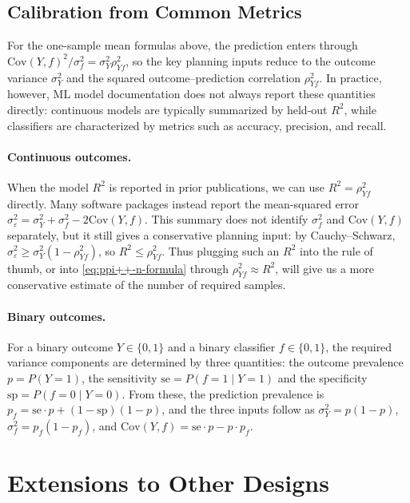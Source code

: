 \documentclass[12pt]{article}
\newcommand{\Cov}{\mathrm{Cov}}
\begin{document}
\subsection{Calibration from Common Metrics}
\label{sec:calibration}

For the one-sample mean formulas above, the prediction enters through
$\Cov(Y,f)^2/\sigma_f^2 = \sigma_Y^2\rho_{Yf}^2$, so the key planning inputs
reduce to the outcome variance $\sigma_Y^2$ and the squared
outcome--prediction correlation $\rho_{Yf}^2$. In practice, however, ML model
documentation does not always report these quantities directly: continuous
models are typically summarized by held-out $R^2$, while classifiers are
characterized by metrics such as accuracy, precision, and recall. 

\paragraph{Continuous outcomes.}
When the model $R^2$ is reported in prior publications, we can use $R^2 = \rho_{Yf}^2$ directly. Many
software packages instead report the mean-squared error
$\sigma_\varepsilon^2 = \sigma_Y^2 + \sigma_f^2 - 2\Cov(Y,f)$. This summary
does not identify $\sigma_f^2$ and $\Cov(Y,f)$ separately, but it still gives
a conservative planning input: by Cauchy--Schwarz,
$\sigma_\varepsilon^2 \geq \sigma_Y^2(1-\rho_{Yf}^2)$, so
$R^2 \leq \rho_{Yf}^2$. Thus plugging such an $R^2$ into the rule of thumb,
or into \eqref{eq:ppi++-n-formula} through $\rho_{Yf}^2 \approx R^2$, will give us a more conservative estimate of the number of required samples.

\paragraph{Binary outcomes.}
\label{sec:sens-spec}
For a binary outcome $Y \in \{0,1\}$ and a binary classifier $f \in
\{0,1\}$, the required variance components are determined by three quantities:
the outcome prevalence $p= P(Y=1)$, the sensitivity $\mathrm{se} = P(f=1
\mid Y=1)$ and the specificity $\mathrm{sp} = P(f=0 \mid Y=0)$. From these, the prediction
prevalence is $p_f = \mathrm{se}\cdot p + (1-\mathrm{sp})(1-p)$, and the
three inputs follow as $\sigma_Y^2 = p(1-p)$, $\sigma_f^2 = p_f(1-p_f)$, and
$\Cov(Y,f) = \mathrm{se}\cdot p - p\cdot p_f$. 


\section{Extensions to Other Designs}
\label{sec:extensions}
\end{document}
